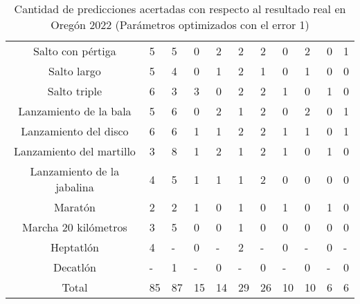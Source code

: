 \begin{table}[H]
{\begin{tabular}{|c|P{1.3cm}|P{1.2cm}|P{1.3cm}|P{1.2cm}|P{1.4cm}|P{1.2cm}|P{1.45cm}|P{1.2cm}|P{1.3cm}|P{1.2cm}|}
            Salto con pértiga & 5 & 5 & 0 & 2 & 2 & 2 & 0 & 2 & 0 & 1 \\
            Salto largo & 5 & 4 & 0 & 1 & 2 & 1 & 0 & 1 & 0 & 0 \\
            Salto triple & 6 & 3 & 3 & 0 & 2 & 2 & 1 & 0 & 1 & 0 \\
            Lanzamiento de la bala & 5 & 6 & 0 & 2 & 1 & 2 & 0 & 2 & 0 & 1 \\
            Lanzamiento del disco & 6 & 6 & 1 & 1 & 2 & 2 & 1 & 1 & 0 & 1 \\
            Lanzamiento del martillo & 3 & 8 & 1 & 2 & 1 & 2 & 1 & 0 & 1 & 0 \\
            Lanzamiento de la jabalina & 4 & 5 & 1 & 1 & 1 & 2 & 0 & 0 & 0 & 0 \\
            Maratón & 2 & 2 & 1 & 0 & 1 & 0 & 1 & 0 & 1 & 0 \\
            Marcha 20 kilómetros & 3 & 5 & 0 & 0 & 1 & 0 & 0 & 0 & 0 & 0 \\
            Heptatlón & 4 & - & 0 & - & 2 & - & 0 & - & 0 & - \\
            Decatlón & - & 1 & - & 0 & - & 0 & - & 0 & - & 0 \\
            \hline
            Total & 85 & 87 & 15 & 14 & 29 & 26 & 10 & 10 & 6 & 6 \\ \hline
        \end{tabular}
        \caption{Cantidad de predicciones acertadas con respecto al resultado real en Oregón 2022 (Parámetros optimizados con el error 1)}
        \label{tab:error1oregon}
    }
\end{table}

